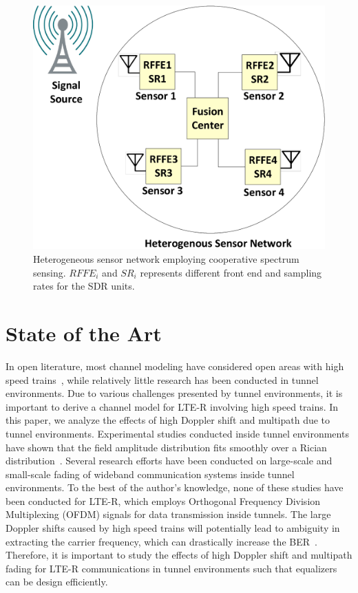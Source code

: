 \begin{figure}[!ht]
\centering
\includegraphics[width=\textwidth,keepaspectratio]{images/Gill/figs/introdiag.eps} 
\caption{Heterogeneous sensor network employing cooperative spectrum sensing. $RFFE_i$ and $SR_i$ represents different front end and sampling rates for the SDR units.}
\label{fig:css}
\end{figure}

\section{State of the Art}
In open literature, most channel modeling have considered open areas with high speed trains~\cite{inplter5,inplter6}, while relatively little research has been conducted in tunnel environments. Due to various challenges presented by tunnel environments, it is important to derive a channel model for LTE-R involving high speed trains. In this paper, we analyze the effects of high Doppler shift and multipath due to tunnel environments. Experimental studies conducted inside tunnel environments have shown that the field amplitude distribution fits smoothly over a Rician distribution~\cite{inplter8}. Several research efforts have been conducted on large-scale and small-scale fading of wideband communication systems inside tunnel environments. To the best of the author’s knowledge, none of these studies have been conducted for LTE-R, which employs Orthogonal Frequency Division Multiplexing (OFDM) signals for data transmission inside tunnels. The large Doppler shifts caused by high speed trains will potentially lead to ambiguity in extracting the carrier frequency, which can drastically increase the BER~\cite{inplter9}. Therefore, it is important to study the effects of high Doppler shift and multipath fading for LTE-R communications in tunnel environments such that equalizers can be design efficiently.

